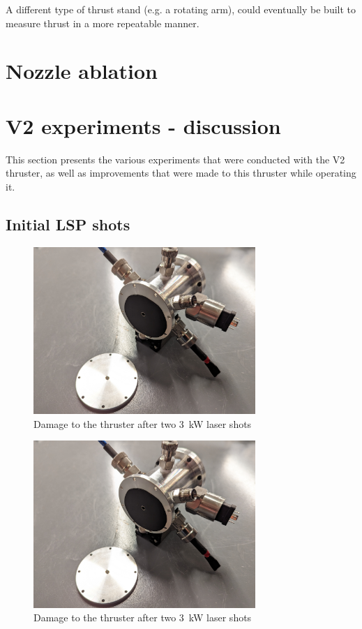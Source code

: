             A different type of thrust stand (e.g. a rotating arm), could eventually be built to measure thrust in a more repeatable manner.

    \section{Nozzle ablation}

    \section{V2 experiments - discussion}
        This section presents the various experiments that were conducted with the V2 thruster, as well as improvements that were made to this thruster while operating it.
    
        \subsection{Initial LSP shots }

            \begin{figure}[!ht]
                \centering
                \includegraphics[width=0.75\textwidth]{assets/4 experiments/V2 test damage.jpg}
                \caption{Damage to the thruster after two \qty{3}{kW} laser shots}
            \end{figure}

            \begin{figure}[!ht]
                \centering
                \includegraphics[width=0.75\textwidth]{assets/4 experiments/V2 test damage.jpg}
                \caption{Damage to the thruster after two \qty{3}{kW} laser shots}
            \end{figure}

